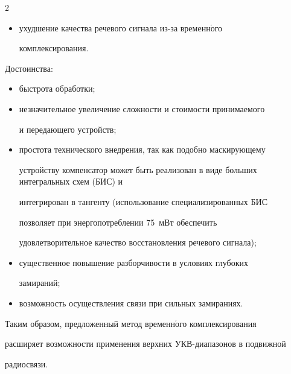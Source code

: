 \begin{multicols}{2}
\begin{itemize}
задержки и, следовательно, проигрыш бескомпенсационной передачи при 


неглубоких замираниях;


\item ухудшение качества речевого сигнала из-за временн$\acute{\mbox{о}}$го 


комплексирования.


     \end{itemize}


     


     Достоинства: 


     \begin{itemize}


\item быстрота обработки;


\item  незначительное увеличение сложности и стоимости принимаемого 


и передающего устройств;


\item простота технического внедрения, так как подобно маскирующему 


устройству компенсатор может быть реализован в виде больших интегральных схем (БИС) и 


интегрирован в тангенту (использование специализированных БИС 


позволяет при энергопотреблении 75~мВт обеспечить 


удовлетворительное качество вос\-ста\-нов\-ле\-ния речевого сигнала); 


\item существенное повышение разборчивости в условиях глубоких 


замираний;


\item  возможность осуществления связи при сильных замираниях.


\end{itemize}





     Таким образом, предложенный метод вре\-мен\-н$\acute{\mbox{о}}$го комплексирования 


расширяет возможности применения верхних УКВ-диа\-па\-зо\-нов в подвижной 


радиосвязи.


     


{\small\frenchspacing


}
\end{multicols}
